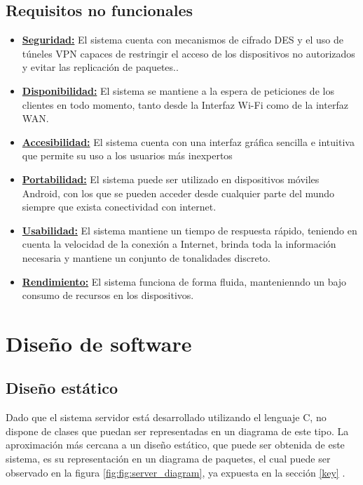 \documentclass[12pt]{article}
\begin{document}
    \subsection{Requisitos no funcionales}
        \begin{itemize}
            \item \textbf{\underline{Seguridad:}}
            El sistema cuenta con mecanismos de cifrado DES y el uso de túneles VPN capaces de restringir el acceso de los dispositivos no autorizados y evitar las replicación de paquetes..
            \item \textbf{\underline{Disponibilidad:}}
            El sistema se mantiene a la espera de peticiones de los clientes en todo momento, tanto desde la Interfaz Wi-Fi como de la interfaz WAN.
            \item \textbf{\underline{Accesibilidad:}}
            El sistema cuenta con una interfaz gráfica sencilla e intuitiva que permite su uso a los usuarios más inexpertos
            \item \textbf{\underline{Portabilidad:}}
            El sistema puede ser utilizado en dispositivos móviles Android, con los que se pueden acceder desde cualquier parte del mundo siempre que exista conectividad con internet.
            \item \textbf{\underline{Usabilidad:}}
            El sistema mantiene un tiempo de respuesta rápido, teniendo en cuenta la velocidad de la conexión a Internet, brinda toda la información necesaria y mantiene un conjunto de tonalidades discreto.
            \item \textbf{\underline{Rendimiento:}}
            El sistema funciona de forma fluida, mantenienndo un bajo consumo de recursos en los dispositivos.
        \end{itemize}

\section{Diseño de software}
    \subsection{Diseño estático}
        Dado que el sistema servidor está desarrollado utilizando el lenguaje C, no dispone de clases que puedan ser representadas en un diagrama de este tipo. La aproximación más cercana a un diseño estático, que puede ser obtenida de este sistema, es su representación en un diagrama de paquetes, el cual puede ser observado en la figura \ref{fig:fig:server_diagram}, ya expuesta en la sección \ref{key} .
\end{document}
